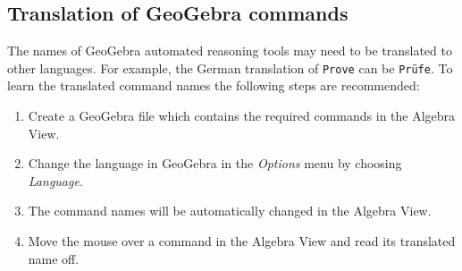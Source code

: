 \documentclass{article}
\begin{document}
\subsection{Translation of GeoGebra commands}

The names of GeoGebra automated reasoning tools may need to be translated to other languages. For example, the German translation of \texttt{Prove} can be \texttt{Pr\"ufe}.
To learn the translated command names the following steps are recommended:

\begin{enumerate}
\item Create a GeoGebra file which contains the required commands in the Algebra View.
\item Change the language in GeoGebra in the \textit{Options} menu by choosing \textit{Language}.
\item The command names will be automatically changed in the Algebra View.
\item Move the mouse over a command in the Algebra View and read its translated name off.
\end{enumerate}
\end{document}

